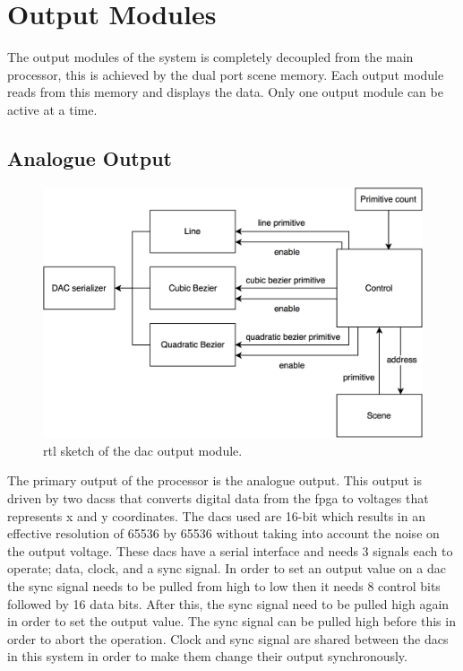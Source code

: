 \chapter{Output Modules}
\label{chap:Output}

The output modules of the system is completely decoupled from the main processor, this is achieved by the dual port scene memory.
Each output module reads from this memory and displays the data.
Only one output module can be active at a time.

\section{Analogue Output}

\begin{figure}[h!]
    \includegraphics[width=\linewidth]{images/dac-output.png}
    \caption{\gls{rtl} sketch of the \vthreek \gls{dac} output module.}
    \label{fig:dac-output}
\end{figure}

The primary output of the processor is the analogue output.
This output is driven by two \gls{dacs}s that converts digital data from the \gls{fpga} to voltages that represents x and y coordinates.
The \gls{dac}s used are 16-bit which results in an effective resolution of 65536 by 65536 without taking into account the noise on the output voltage.
These \gls{dac}s have a serial interface and needs 3 signals each to operate; data, clock, and a sync signal.
In order to set an output value on a \gls{dac} the sync signal needs to be pulled from high to low then it needs 8 control bits followed by 16 data bits.
After this, the sync signal need to be pulled high again in order to set the output value.
The sync signal can be pulled high before this in order to abort the operation.
Clock and sync signal are shared between the \gls{dac}s in this system in order to make them change their output synchronously.

